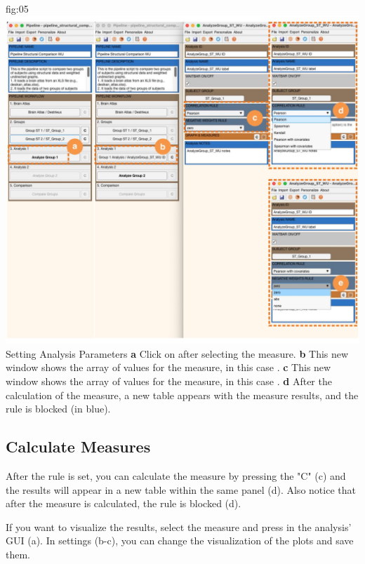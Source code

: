 \documentclass[justified]{tufte-handout}
\begin{document}
	{fig:05}
	{
	\includegraphics{fig05.jpg}
	}
	{Setting Analysis Parameters}
	{
	{\bf a} Click on  after selecting the measure.
	{\bf b} This new window shows the array of values for the measure, in this case .
 	{\bf c} This new window shows the array of values for the measure, in this case .
 	{\bf d} After the calculation of the measure, a new table appears with the measure results, and the rule is blocked (in blue).
 }
 
\subsection{Calculate Measures}
After the rule is set, you can calculate the measure by pressing the "C" (c) and the results will appear in a new table within the same panel (d). Also notice that after the measure is calculated, the rule is blocked (d).
 
 If you want to visualize the results, select the measure and press  in the analysis' GUI (a). In settings (b-c), you can change the visualization of the plots and save them. 
 
\end{document}
